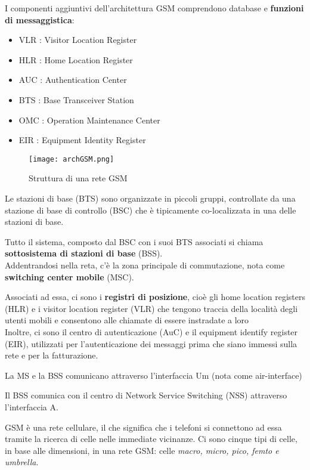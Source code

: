 I componenti aggiuntivi dell'architettura GSM comprendono database e
\textbf{funzioni di messaggistica}:

\begin{itemize}
  \item VLR : Visitor Location Register
  \item HLR : Home Location Register
  \item AUC : Authentication Center
  \item BTS : Base Transceiver Station
  \item OMC : Operation Maintenance Center
  \item EIR : Equipment Identity Register
\end{itemize}

\begin{figure}[H]
  \centering
  \texttt{[image: archGSM.png]}
  \caption{Struttura di una rete GSM}
  \label{fig:archGSM}
\end{figure}

Le stazioni di base (BTS) sono organizzate in piccoli gruppi, controllate da
una stazione di base di controllo (BSC) che è tipicamente co-localizzata in una
delle stazioni di base.

Tutto il sistema, composto dal BSC con i suoi BTS associati si chiama
\textbf{sottosistema di stazioni di base} (BSS). \\

Addentrandosi nella reta, c'è la zona principale di commutazione, nota come
\textbf{switching center mobile} (MSC).

Associati ad essa, ci sono i \textbf{registri di posizione}, cioè gli
home location registers (HLR) e i visitor location register (VLR) che tengono
traccia della località degli utenti mobili e consentono alle chiamate di
essere instradate a loro\\

Inoltre, ci sono il centro di autenticazione (AuC) e il equipment identify
register (EIR), utilizzati per l'autenticazione dei messaggi prima
che siano immessi sulla rete e per la fatturazione.

La MS e la BSS comunicano attraverso l'interfaccia Um (nota come
air-interface)

Il BSS comunica con il centro di Network Service Switching (NSS) attraverso
l'interfaccia A.

GSM è una rete cellulare, il che significa che i telefoni si
connettono ad essa tramite la ricerca di celle nelle immediate vicinanze.
Ci sono cinque tipi di celle, in base alle dimensioni, in una rete GSM:
celle \textit{macro, micro, pico, femto e umbrella}.

